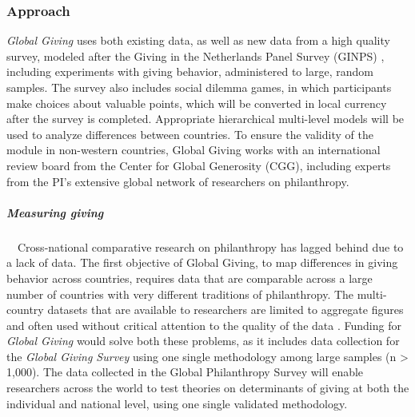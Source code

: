 \documentclass[twocolumn, serif, rga, numeric]{jote-article}
\begin{document}
 {}\subsubsection*{Approach} 

\emph{Global Giving} uses both existing data, as well as new data from a high quality survey, modeled after the Giving in the Netherlands Panel Survey (GINPS) \cite{Bekkers2006a, Bekkers2011c}, including experiments with giving behavior, administered to large, random samples. The survey also includes social dilemma games, in which participants make choices about valuable points, which will be converted in local currency after the survey is completed. Appropriate hierarchical multi-level models will be used to analyze differences between countries. To ensure the validity of the module in non-western countries, Global Giving works with an international review board from the Center for Global Generosity (CGG), including experts from the PI's extensive global network of researchers on philanthropy.

\subparagraph{Measuring giving}

\ \ Cross-national comparative research on philanthropy has lagged behind due to a lack of data. The first objective of Global Giving, to map differences in giving behavior across countries, requires data that are comparable across a large number of countries with very different traditions of philanthropy. The multi-country datasets that are available to researchers are limited to aggregate figures and often used without critical attention to the quality of the data \cite{Bekkers2016}. Funding for \emph{Global Giving} would solve both these problems, as it includes data collection for the \emph{Global Giving Survey} using one single methodology among large samples (n \textgreater{} 1,000). The data collected in the Global Philanthropy Survey will enable researchers across the world to test theories on determinants of giving at both the individual and national level, using one single validated methodology.
\end{document}
